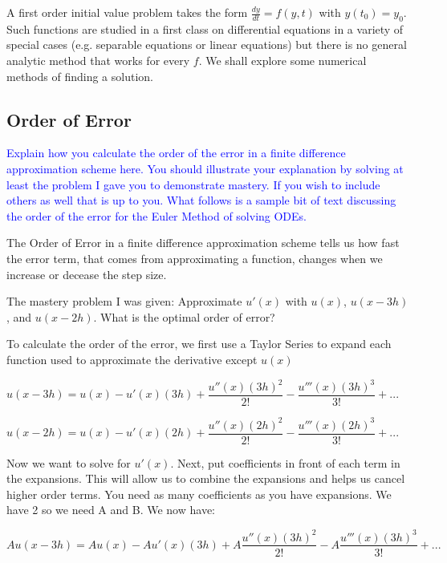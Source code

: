 \documentclass{article}
\def\ds{\displaystyle}
\def\d#1#2{\frac{d#1}{d#2}} %
\newcommand{\blue}[1]{\textcolor{blue}{#1}}
\begin{document}
A first order initial value problem takes the form \(\ds \d{y}{t} = f(y,t)\) with \(\ds y(t_0)=y_0\). Such functions are studied in a first class on differential equations in a variety of special cases (e.g. separable equations or linear
equations) but there is no general analytic method that works for every \(f\). We shall explore some numerical methods of finding a solution.
\subsection{Order of Error}
\blue{Explain how you calculate the order of the error in a finite difference approximation scheme here. You should illustrate your explanation by solving at least the problem I gave you to demonstrate mastery. If you wish to include others as well that is up to you. What follows is a sample bit of text discussing the order of the error for the Euler Method of solving ODEs.} \newline

The Order of Error in a finite difference approximation scheme tells us how fast the error term, that comes from approximating a function, changes when we increase or decease the step size.\newline

The mastery problem I was given: Approximate $u'(x)$ with $u(x)$, $u(x-3h)$, and $u(x-2h)$. What is the optimal order of error? \newline

To calculate the order of the error, we first use a Taylor Series to expand each function used to approximate the derivative except $u(x)$

$u(x-3h) = u(x) - u'(x)(3h) + \dfrac{u''(x)(3h)^2}{2!} -  \dfrac{u'''(x)(3h)^3}{3!}+... $ \newline

$u(x-2h) = u(x) - u'(x)(2h) + \dfrac{u''(x)(2h)^2}{2!} - \dfrac{u'''(x)(2h)^3}{3!}+... $ \newline

Now we want to solve for $u'(x)$. Next, put coefficients in front of each term in the expansions. This will allow us to combine the expansions and helps us cancel higher order terms. You need as many coefficients as you have expansions. We have 2 so we need A and B.\newline
We now have: \newline

$Au(x-3h) = Au(x) - Au'(x)(3h) + A\dfrac{u''(x)(3h)^2}{2!} -  A\dfrac{u'''(x)(3h)^3}{3!}+... $ \newline
\end{document}
